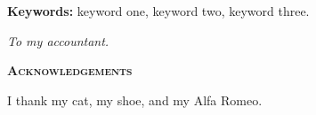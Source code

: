 \noindent \textbf{Keywords:} keyword one, keyword two, keyword three.

\newpage

\noindent \begin{Large}\emph{To my accountant.}\end{Large}

\newpage

\begin{center}\textbf{\textsc{Acknowledgements}}\end{center}

I thank my cat, my shoe, and my Alfa Romeo.

\singlespacing

\newpage
